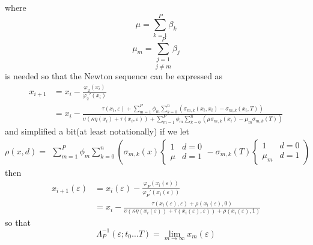 \documentclass{amsart}
\begin{document}
where
\begin{equation}
  \mu = \sum_{k = 1}^P \beta_k
\end{equation}
\begin{equation}
  \mu_m = \underset{j \neq m}{\sum_{j = 1}^P} \beta_j
\end{equation}
is needed so that the Newton sequence can be expressed as
\begin{equation}
  \begin{array}{ll}
    x_{i + 1} & = x_i - \frac{\varphi_2 ( x_i)}{\varphi_2' ( x_i)}\\
    & = x_i - \frac{\tau ( x_i, \varepsilon) + \sum_{m = 1}^P \phi_m  \sum_{k
    = 0}^n ( \sigma_{m, k} ( x_i, x_i) - \sigma_{m, k} ( x_i, T))}{\upsilon (
    \kappa \eta ( x_i) + \tau ( x_i, \varepsilon)) + \sum_{m = 1}^P \phi_m 
    \sum_{k = 0}^n ( \mu \sigma_{m, k} ( x_i) - \mu_m \sigma_{m, k} ( T))}
  \end{array}
\end{equation}
and simplified a bit(at least notationally) if we let
\begin{equation}
  \rho ( x, d) = \begin{array}{l}
    \sum_{m = 1}^P \phi_m \sum_{k = 0}^n \left( \sigma_{m, k} ( x) \left\{
    \begin{array}{ll}
      1 & d = 0\\
      \mu & d = 1
    \end{array} \right. - \sigma_{m, k} ( T) \left\{ \begin{array}{ll}
      1 & d = 0\\
      \mu_m & d = 1
    \end{array} \right. \right)
  \end{array}
\end{equation}
then
\begin{equation}
  \begin{array}{ll}
    x_{i + 1} ( \varepsilon) & = x_i ( \varepsilon) - \frac{\varphi_P ( x_i (
    \varepsilon))}{\varphi_P' ( x_i ( \varepsilon))}\\
    & = x_i - \frac{\tau ( x_i ( \varepsilon), \varepsilon) + \rho ( x_i (
    \varepsilon), 0)}{\upsilon ( \kappa \eta ( x_i ( \varepsilon)) + \tau (
    x_i ( \varepsilon), \varepsilon)) + \rho ( x_i ( \varepsilon), 1)}
  \end{array}
\end{equation}
so that
\begin{equation}
  \Lambda_P^{- 1} ( \varepsilon ; t_0 \ldots T) = \lim_{m \rightarrow \infty}
  x_m ( \varepsilon)
\end{equation}
\end{document}
